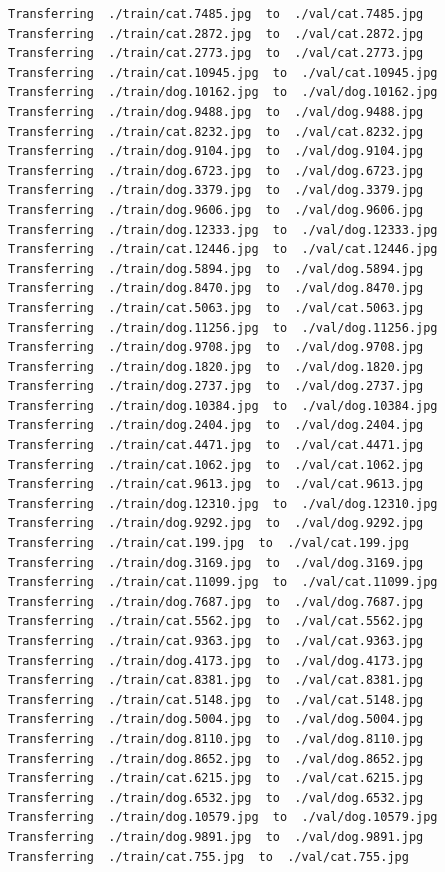 \documentclass[]{book}
\theoremstyle{definition}
\theoremstyle{definition}
\theoremstyle{definition}
\theoremstyle{remark}
\begin{document}
\begin{verbatim}
Transferring  ./train/cat.7485.jpg  to  ./val/cat.7485.jpg
Transferring  ./train/cat.2872.jpg  to  ./val/cat.2872.jpg
Transferring  ./train/cat.2773.jpg  to  ./val/cat.2773.jpg
Transferring  ./train/cat.10945.jpg  to  ./val/cat.10945.jpg
Transferring  ./train/dog.10162.jpg  to  ./val/dog.10162.jpg
Transferring  ./train/dog.9488.jpg  to  ./val/dog.9488.jpg
Transferring  ./train/cat.8232.jpg  to  ./val/cat.8232.jpg
Transferring  ./train/dog.9104.jpg  to  ./val/dog.9104.jpg
Transferring  ./train/dog.6723.jpg  to  ./val/dog.6723.jpg
Transferring  ./train/dog.3379.jpg  to  ./val/dog.3379.jpg
Transferring  ./train/dog.9606.jpg  to  ./val/dog.9606.jpg
Transferring  ./train/dog.12333.jpg  to  ./val/dog.12333.jpg
Transferring  ./train/cat.12446.jpg  to  ./val/cat.12446.jpg
Transferring  ./train/dog.5894.jpg  to  ./val/dog.5894.jpg
Transferring  ./train/dog.8470.jpg  to  ./val/dog.8470.jpg
Transferring  ./train/cat.5063.jpg  to  ./val/cat.5063.jpg
Transferring  ./train/dog.11256.jpg  to  ./val/dog.11256.jpg
Transferring  ./train/dog.9708.jpg  to  ./val/dog.9708.jpg
Transferring  ./train/dog.1820.jpg  to  ./val/dog.1820.jpg
Transferring  ./train/dog.2737.jpg  to  ./val/dog.2737.jpg
Transferring  ./train/dog.10384.jpg  to  ./val/dog.10384.jpg
Transferring  ./train/dog.2404.jpg  to  ./val/dog.2404.jpg
Transferring  ./train/cat.4471.jpg  to  ./val/cat.4471.jpg
Transferring  ./train/cat.1062.jpg  to  ./val/cat.1062.jpg
Transferring  ./train/cat.9613.jpg  to  ./val/cat.9613.jpg
Transferring  ./train/dog.12310.jpg  to  ./val/dog.12310.jpg
Transferring  ./train/dog.9292.jpg  to  ./val/dog.9292.jpg
Transferring  ./train/cat.199.jpg  to  ./val/cat.199.jpg
Transferring  ./train/dog.3169.jpg  to  ./val/dog.3169.jpg
Transferring  ./train/cat.11099.jpg  to  ./val/cat.11099.jpg
Transferring  ./train/dog.7687.jpg  to  ./val/dog.7687.jpg
Transferring  ./train/cat.5562.jpg  to  ./val/cat.5562.jpg
Transferring  ./train/cat.9363.jpg  to  ./val/cat.9363.jpg
Transferring  ./train/dog.4173.jpg  to  ./val/dog.4173.jpg
Transferring  ./train/cat.8381.jpg  to  ./val/cat.8381.jpg
Transferring  ./train/cat.5148.jpg  to  ./val/cat.5148.jpg
Transferring  ./train/dog.5004.jpg  to  ./val/dog.5004.jpg
Transferring  ./train/dog.8110.jpg  to  ./val/dog.8110.jpg
Transferring  ./train/dog.8652.jpg  to  ./val/dog.8652.jpg
Transferring  ./train/cat.6215.jpg  to  ./val/cat.6215.jpg
Transferring  ./train/dog.6532.jpg  to  ./val/dog.6532.jpg
Transferring  ./train/dog.10579.jpg  to  ./val/dog.10579.jpg
Transferring  ./train/dog.9891.jpg  to  ./val/dog.9891.jpg
Transferring  ./train/cat.755.jpg  to  ./val/cat.755.jpg

\end{verbatim}
\end{document}
